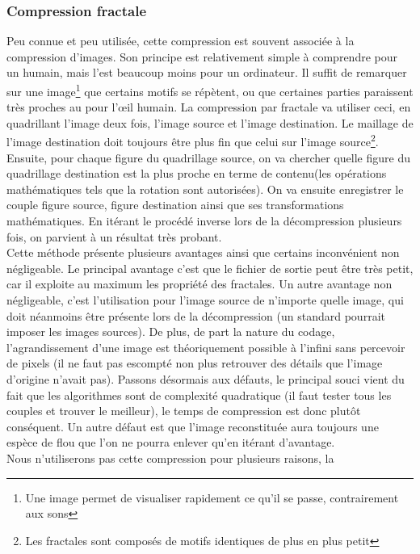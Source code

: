 		\subsubsection{Compression fractale}
Peu connue et peu utilisée,  cette compression est souvent associée à la
compression d'images.  Son principe est relativement simple à comprendre
pour un humain, mais l'est beaucoup moins pour un ordinateur.  Il suffit
de  remarquer  sur une  image\footnote{Une  image  permet  de visualiser
rapidement ce  qu'il  se  passe,  contrairement  aux  sons} que certains
motifs se répètent,  ou que certaines parties paraissent très proches au
pour l'œil  humain.  La compression par fractale  va utiliser ceci,  en
quadrillant l'image  deux fois,  l'image source  et l'image destination.
Le maillage de l'image destination doit toujours être plus fin que celui
sur  l'image  source\footnote{Les  fractales  sont  composés  de  motifs
identiques de  plus  en  plus  petit}.  Ensuite,  pour  chaque figure du
quadrillage  source,   on  va  chercher  quelle  figure  du  quadrillage
destination  est  la plus  proche  en  terme  de  contenu(les opérations
mathématiques tels  que  la  rotation  sont  autorisées).  On va ensuite
enregistrer le  couple figure source,  figure destination  ainsi que ses
transformations mathématiques.  En itérant le procédé inverse lors de la
décompression plusieurs fois, on parvient à un résultat très probant.\\
Cette  méthode   présente   plusieurs   avantages   ainsi  que  certains
inconvénient  non  négligeable.  Le  principal  avantage  c'est  que  le
fichier de sortie peut être très  petit,  car il exploite au maximum les
propriété  des  fractales.  Un  autre  avantage  non négligeable,  c'est
l'utilisation pour  l'image source de n'importe  quelle image,  qui doit
néanmoins être présente  lors de la décompression  (un standard pourrait
imposer les  images sources).  De  plus,  de part  la nature  du codage,
l'agrandissement d'une image est  théoriquement possible à l'infini sans
percevoir de  pixels (il  ne faut  pas escompté  non plus  retrouver des
détails  que  l'image  d'origine  n'avait  pas).  Passons  désormais aux
défauts,  le principal souci  vient du fait que les  algorithmes sont de
complexité quadratique  (il faut tester  tous les couples  et trouver le
meilleur), le temps de compression est donc plutôt conséquent.  Un autre
défaut est que l'image reconstituée aura toujours une espèce de flou que
l'on ne pourra enlever qu'en itérant d'avantage.\\
Nous n'utiliserons  pas  cette  compression  pour plusieurs raisons,  la
